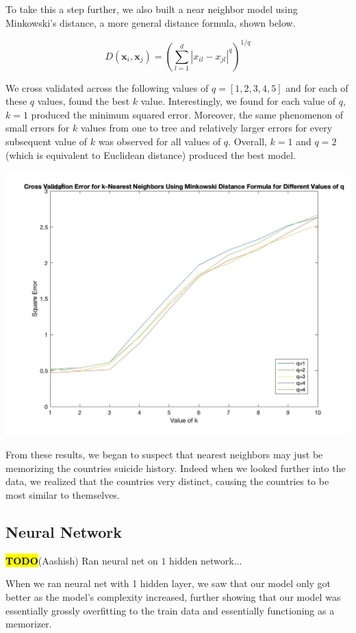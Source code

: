 \documentclass{article}
\newcommand{\TODO}{\textcolor{red}{\textbf{\hl{TODO}}}}
\begin{document}
\begin{multicols}{2}
To take this a step further, we also built a near neighbor model using Minkowski's distance, a more general distance formula, shown below.

\[D\left(\mathbf{x}_{i}, \mathbf{x}_{j}\right)=\left(\sum_{l=1}^{d}\left|x_{i l}-x_{j l}\right|^{q}\right)^{1/q}\]

We cross validated across the following values of $q = [1, 2, 3, 4, 5]$ and for each of these $q$ values, found the best $k$ value. Interestingly, we found for each value of $q$, $k = 1$ produced the minimum squared error. Moreover, the same phenomenon of small errors for $k$ values from one to tree and relatively larger errors for every subsequent value of $k$ was observed for all values of $q$. Overall, $k = 1$ and $q = 2$ (which is equivalent to Euclidean distance) produced the best model.

\includegraphics[width=\columnwidth]{../Figures/k_nn_err_cv_minkowski.jpg}

From these results, we began to suspect that nearest neighbors may just be memorizing the countries suicide history. Indeed when we looked further into the data, we realized that the countries very distinct, causing the countries to be most similar to themselves.

\subsection{Neural Network} \TODO(Aashish) Ran neural net on $1$ hidden network...

When we ran neural net with 1 hidden layer, we saw that our model only got better as the model’s complexity increased, further showing that our model was essentially grossly overfitting to the train data and essentially functioning as a memorizer.


\end{multicols}
\end{document}
